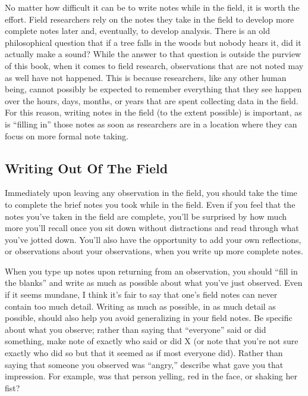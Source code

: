 No matter how difficult it can be to write notes while in the field, it is worth the effort. Field researchers rely on the notes they take in the field to develop more complete notes later and, eventually, to develop analysis. There is an old philosophical question that if a tree falls in the woods but nobody hears it, did it actually make a sound? While the answer to that question is outside the purview of this book, when it comes to field research, observations that are not noted may as well have not happened. This is because researchers, like any other human being, cannot possibly be expected to remember everything that they see happen over the hours, days, months, or years that are spent collecting data in the field. For this reason, writing notes in the field (to the extent possible) is important, as is ``filling in'' those notes as soon as researchers are in a location where they can focus on more formal note taking.

\subsection{Writing Out Of The Field}

Immediately upon leaving any observation in the field, you should take the time to complete the brief notes you took while in the field. Even if you feel that the notes you’ve taken in the field are complete, you’ll be surprised by how much more you’ll recall once you sit down without distractions and read through what you’ve jotted down. You’ll also have the opportunity to add your own reflections, or observations about your observations, when you write up more complete notes.

When you type up notes upon returning from an observation, you should ``fill in the blanks'' and write as much as possible about what you’ve just observed. Even if it seems mundane, I think it’s fair to say that one’s field notes can never contain too much detail. Writing as much as possible, in as much detail as possible, should also help you avoid generalizing in your field notes. Be specific about what you observe; rather than saying that ``everyone'' said or did something, make note of exactly who said or did X (or note that you’re not sure exactly who did so but that it seemed as if most everyone did). Rather than saying that someone you observed was ``angry,'' describe what gave you that impression. For example, was that person yelling, red in the face, or shaking her fist?

